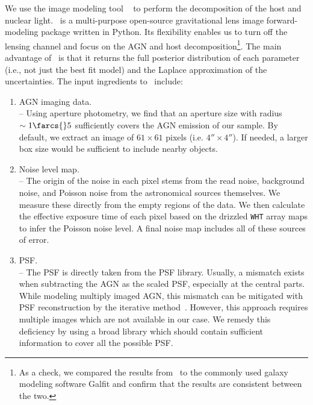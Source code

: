 \documentclass[apj]{emulateapj}
\begin{document}
We use the image modeling tool \lenstronomy~\citep{lenstronomy} to perform the decomposition of the host and nuclear light. \lenstronomy\ is a multi-purpose open-source gravitational lens image forward-modeling package written in Python. 
Its flexibility enables us to turn off the lensing channel and focus on the AGN and host decomposition\footnote{As a check, we compared the results from \lenstronomy\ to the commonly used galaxy modeling software {\sc Galfit} and confirm that the results are consistent between the two.}. The main advantage of \lenstronomy\ is that it returns the full posterior distribution of each parameter (i.e., not just the best fit model) and the Laplace approximation of the uncertainties. The input ingredients to \lenstronomy\ include:
\begin{enumerate}
\item AGN imaging data. \\
-- Using aperture photometry, we find that an aperture size with radius $\sim1\farcs{}5$ sufficiently covers the AGN emission of our sample. By default, we extract an image of $61\times61$ pixels (i.e. $4''\times 4''$). If needed, a larger box size would be sufficient to include nearby objects. 
\item Noise level map.\\
-- The origin of the noise in each pixel stems from the read noise, background noise, and Poisson noise from the astronomical sources themselves. We measure these directly from the empty regions of the data. We then calculate the effective exposure time of each pixel based on the drizzled \texttt{WHT} array maps to infer the Poisson noise level. A final noise map includes all of these sources of error. 
  
\item PSF. \\
-- The PSF is directly taken from the PSF library. Usually, a mismatch exists when subtracting the AGN as the scaled PSF, especially at the central parts. While modeling multiply imaged AGN, this mismatch can be mitigated with PSF reconstruction by the iterative method~\citep{Chen2016, Birrer2018}.  However, this approach requires multiple images which are not available in our case.  We remedy this deficiency by using a broad library which should contain sufficient information to cover all the possible PSF. 
\end{enumerate}

\end{document}
